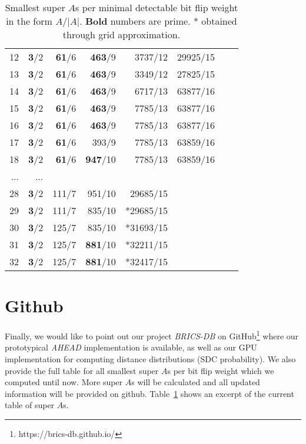 \begin{table}
\begin{tabular}{r|rrrrrrr}
		12 & \textbf{3}/2 & \textbf{61}/6 &  \textbf{463}/9 &          3737/12 &          29925/15 \\
		13 & \textbf{3}/2 & \textbf{61}/6 &  \textbf{463}/9 &          3349/12 &          27825/15 \\
		14 & \textbf{3}/2 & \textbf{61}/6 &  \textbf{463}/9 &          6717/13 &          63877/16 \\
		15 & \textbf{3}/2 & \textbf{61}/6 &  \textbf{463}/9 &          7785/13 &          63877/16 \\
		16 & \textbf{3}/2 & \textbf{61}/6 &  \textbf{463}/9 &          7785/13 &          63877/16 \\
		17 & \textbf{3}/2 & \textbf{61}/6 &           393/9 &          7785/13 &          63859/16 \\
		18 & \textbf{3}/2 & \textbf{61}/6 & \textbf{947}/10 &          7785/13 &          63859/16 \\
		... & ... \\
		28 & \textbf{3}/2 &         111/7 &          951/10 &         29685/15 \\
		29 & \textbf{3}/2 &         111/7 &          835/10 &        *29685/15 \\
		30 & \textbf{3}/2 &         125/7 &          835/10 &        *31693/15 \\
		31 & \textbf{3}/2 &         125/7 & \textbf{881}/10 &        *32211/15 \\
		32 & \textbf{3}/2 &         125/7 & \textbf{881}/10 &        *32417/15 \\
		\bottomrule
	\end{tabular}
	\caption{Smallest super \(A\)s per minimal detectable bit flip weight in the form \(A/|A|\). \textbf{Bold} numbers are prime. * obtained through grid approximation.}
	\label{tab:optimalAsComplete}
	\vspace{-3em}
\end{table}

\section{Github}
\label{sec:GitHub}
Finally, we would like to point out our project \emph{BRICS-DB} on GitHub\footnote{https://brics-db.github.io/} where our prototypical \emph{AHEAD} implementation is available, as well as our GPU implementation for computing distance distributions (SDC probability). We also provide the full table for all smallest super \(A\)s per bit flip weight which we computed until now. More super \(A\)s will be calculated and all updated information will be provided on github. Table~\ref{tab:optimalAsComplete} shows an excerpt of the current table of super \(A\)s.


